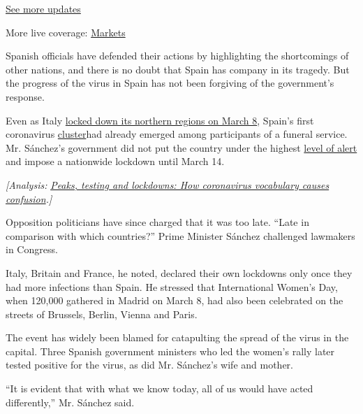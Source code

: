 \href{https://www.nytimes3xbfgragh.onion/2020/09/08/world/covid-19-coronavirus.html?action=click\&pgtype=Article\&state=default\&region=MAIN_CONTENT_1\&context=storylines_live_updates}{See
more updates}

More live coverage:
\href{https://www.nytimes3xbfgragh.onion/live/2020/09/08/business/stock-market-today-coronavirus?action=click\&pgtype=Article\&state=default\&region=MAIN_CONTENT_1\&context=storylines_live_updates}{Markets}

Spanish officials have defended their actions by highlighting the
shortcomings of other nations, and there is no doubt that Spain has
company in its tragedy. But the progress of the virus in Spain has not
been forgiving of the government's response.

Even as Italy
\href{https://www.nytimes3xbfgragh.onion/2020/03/08/world/europe/italy-coronavirus-quarantine.html}{locked
down its northern regions on March 8}, Spain's first coronavirus
\href{https://elpais.com/sociedad/2020-03-06/mas-de-60-personas-se-contagiaron-a-la-vez-en-un-funeral-en-vitoria.html}{cluster}had
already emerged among participants of a funeral service. Mr. Sánchez's
government did not put the country under the highest
\href{https://www.nytimes3xbfgragh.onion/2020/03/13/world/europe/spain-coronavirus-emergency.html}{level
of alert} and impose a nationwide lockdown until March 14.

\emph{{[}Analysis:}
\href{https://www.nytimes3xbfgragh.onion/2020/04/03/world/europe/coronavirus-language-confusion.html}{\emph{Peaks,
testing and lockdowns: How coronavirus vocabulary causes
confusion}}\emph{.{]}}

Opposition politicians have since charged that it was too late. ``Late
in comparison with which countries?'' Prime Minister Sánchez challenged
lawmakers in Congress.

Italy, Britain and France, he noted, declared their own lockdowns only
once they had more infections than Spain. He stressed that International
Women's Day, when 120,000 gathered in Madrid on March 8, had also been
celebrated on the streets of Brussels, Berlin, Vienna and Paris.

The event has widely been blamed for catapulting the spread of the virus
in the capital. Three Spanish government ministers who led the women's
rally later tested positive for the virus, as did Mr. Sánchez's wife and
mother.

``It is evident that with what we know today, all of us would have acted
differently,'' Mr. Sánchez said.

